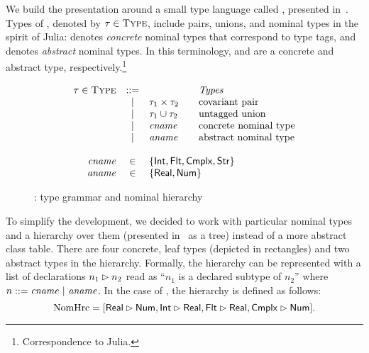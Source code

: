 
We build the presentation around a small type language called \BetaJulia,
presented in~.
Types of \BetaJulia, denoted by $\tau \in \textsc{Type}$, include pairs, unions, 
and nominal types in the spirit of Julia:
\cname denotes \emph{concrete} nominal types that correspond to type tags,
and \aname denotes \emph{abstract} nominal types.
In this terminology,  and  are
a concrete and abstract type, respectively.\footnote{Correspondence to Julia.}

\begin{figure}
  \[
	\begin{array}{rcl@{\qquad}l}
	\ty \in \Type & ::= & & \text{\emph{Types}}
	\\ &\Alt& \typair{\ty_1}{\ty_2}  & \text{covariant pair}
	\\ &\Alt& \tyunion{\ty_1}{\ty_2} & \text{untagged union}
	\\ &\Alt& \cname  & \text{concrete nominal type}
	\\ &\Alt& \aname  & \text{abstract nominal type}
	\\ \\
	\cname & \in &
	  \multicolumn{2}{l}{\{ \tyint, \tyflt, \tycmplx, \tystr \}}
	\\ 
	\aname & \in & \multicolumn{2}{l}{\{ \tyreal, \tynum \}}
	\end{array}
  \]
  \caption{\BetaJulia: type grammar and nominal hierarchy}
  \label{fig:bjsem-types}
\end{figure}

To simplify the development, we decided to work with particular 
nominal types and a hierarchy over them
(presented in~ as a tree)
instead of a more abstract class table.
There are four concrete, leaf types (depicted in rectangles)
and two abstract types in the hierarchy. 
Formally, the hierarchy can be represented with a list of declarations
$n_1 \rhd n_2$ read as ``$n_1$ is a declared subtype of $n_2$''
where $n ::= \mathit{cname} ~\vert~ \mathit{aname}$.
In the case of \BetaJulia, the hierarchy is defined as follows:
\[
\textrm{NomHrc} = [ \mathsf{Real} \rhd \mathsf{Num}, 
\mathsf{Int} \rhd \mathsf{Real}, \mathsf{Flt} \rhd \mathsf{Real},
\mathsf{Cmplx} \rhd \mathsf{Num} ].
\]

